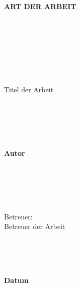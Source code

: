 \pagestyle{empty}
\begin{center}
\ \\ \ \\ \ \\
\begin{Large}
\textbf{ART DER ARBEIT}
\end{Large}
\\ \ \\ \ \\ \ \\ \ \\ \ \\
\begin{Large}
Titel der Arbeit
\end{Large}
\\ \ \\ \ \\ \ \\
\begin{Large}
\textbf{Autor}
\end{Large}
\\ \ \\ \ \\ \ \\
\begin{large}
Betreuer:\\
Betreuer der Arbeit
\end{large}
\\ \ \\ \ \\
\begin{large}
\textbf{Datum}
\end{large}
\end{center}
